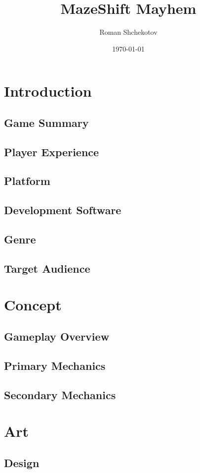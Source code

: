 \documentclass[a4paper]{article}
\title{MazeShift Mayhem}
\author{Roman Shchekotov}
\date{\today}
\begin{document}
  \maketitle
  \tableofcontents

  \section{Introduction}
  \subsection{Game Summary}
  \subsection{Player Experience}
  \subsection{Platform}
  \subsection{Development Software}
  \subsection{Genre}
  \subsection{Target Audience}
  \section{Concept}
  \subsection{Gameplay Overview}
  \subsection{Primary Mechanics}
  \subsection{Secondary Mechanics}
  \section{Art}
  \subsection{Design}
\end{document}
